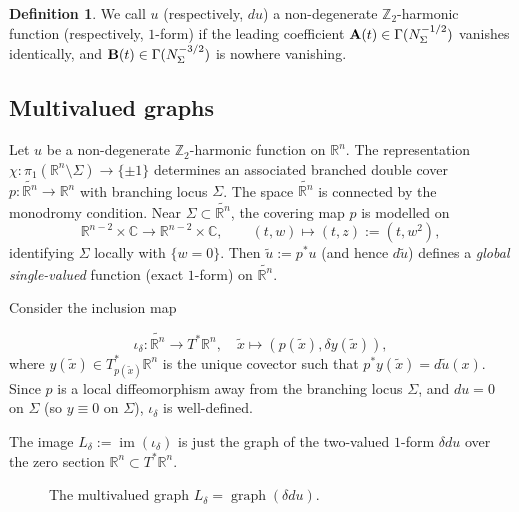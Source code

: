 \documentclass[11pt,a4paper]{article}
\numberwithin{equation}{section}%
\theoremstyle{definition}
\newtheorem{Def}[thm]{Definition}
\newcommand{\R}{\mathbb{R}}
\newcommand{\C}{\mathbb{C}}
\newcommand{\Z}{\mathbb{Z}}
\begin{document}
\begin{Def}
    We call $u$ (respectively, $du$) a non-degenerate $\Z_2$-harmonic function (respectively, $1$-form) if the leading coefficient ${\bf{A}}(t)\in \Gamma(N_{\Sigma}^{-1/2})$ vanishes identically, and ${\bf{B}}(t)\in \Gamma(N_\Sigma^{-3/2})$ is nowhere vanishing. 
\end{Def}

\subsection{Multivalued graphs}
\label{sec:multivaluedgraph}
Let $u$ be a non-degenerate $\Z_2$-harmonic function on $\R^n$. The representation
$\chi:\pi_1(\R^n\setminus \Sigma)\to \{\pm1\}$
determines an associated branched double cover $p:\widetilde{\R^n}\to \R^n$ with branching locus $\Sigma$. The space $\widetilde{\R^n}$ is connected by the monodromy condition. Near $\Sigma\subset \widetilde{\R^n}$, the covering map $p$ is modelled on
\[
    \R^{n-2}\times \C \to \R^{n-2}\times \C,
    \qquad
    (t,w)\mapsto (t,z):=(t,w^2),
\]
identifying $\Sigma$ locally with $\{w=0\}$. Then $\tilde u:=p^*u$ (and hence $d\tilde u$) defines a \textit{global single-valued} function (exact $1$-form) on $\widetilde{\R^n}$.  

Consider the inclusion map

\begin{equation}
    \label{eqn:iotadelta}
    \iota_{\delta }:\widetilde{\R^n}\to T^*\R^n,
    \quad
    \tilde x\mapsto (p(\tilde x),\delta y(\tilde x)),
\end{equation}
where $y(\tilde x)\in T^*_{p(\tilde x)}\R^n$ is the unique covector such that $p^*y(\tilde x)=d\tilde u(x)$. Since $p$ is a local diffeomorphism away from the branching locus $\Sigma$, and $du=0$ on $\Sigma$ (so $y\equiv 0$ on $\Sigma$), $\iota_\delta$ is well-defined. 

The image $L_{\delta}:=\operatorname{im}(\iota_\delta)$ is just the graph of the two-valued $1$-form $\delta du$ over the zero section $\R^n\subset T^*\R^n$. 

\begin{figure}[H]
    \centering
    \caption{The multivalued graph $L_{\delta}=\operatorname{graph}(\delta du)$.}
    \label{fig:idaslg}
\end{figure}
\end{document}
